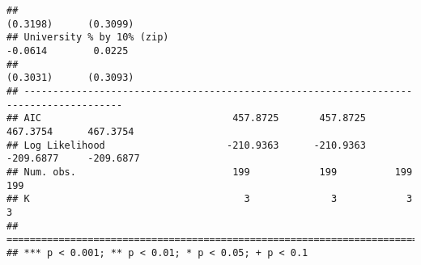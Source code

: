 \documentclass[
]{article}
\begin{document}
\begin{verbatim}
##                                                                  (0.3198)      (0.3099)
## University % by 10% (zip)                                        -0.0614        0.0225 
##                                                                  (0.3031)      (0.3093)
## ---------------------------------------------------------------------------------------
## AIC                                 457.8725       457.8725     467.3754      467.3754 
## Log Likelihood                     -210.9363      -210.9363    -209.6877     -209.6877 
## Num. obs.                           199            199          199           199      
## K                                     3              3            3             3      
## =======================================================================================
## *** p < 0.001; ** p < 0.01; * p < 0.05; + p < 0.1
\end{verbatim}
\end{document}

